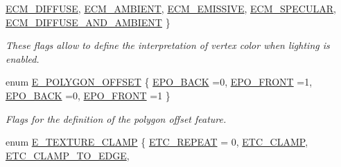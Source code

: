 \begin{DoxyCompactItemize}
\hyperlink{namespaceirr_1_1video_a41af617fc9a691366e4b162cd1cdea78a6c78d3ae122aa9bd1743000ed8987a49}{E\+C\+M\+\_\+\+D\+I\+F\+F\+U\+SE}, 
\newline
\hyperlink{namespaceirr_1_1video_a41af617fc9a691366e4b162cd1cdea78aa33e23437b5ba836e2517bd59868bc7f}{E\+C\+M\+\_\+\+A\+M\+B\+I\+E\+NT}, 
\hyperlink{namespaceirr_1_1video_a41af617fc9a691366e4b162cd1cdea78ac59b7c51c45959923de37c5cb3614515}{E\+C\+M\+\_\+\+E\+M\+I\+S\+S\+I\+VE}, 
\hyperlink{namespaceirr_1_1video_a41af617fc9a691366e4b162cd1cdea78ac152b787506407d3f60d06e91e537afa}{E\+C\+M\+\_\+\+S\+P\+E\+C\+U\+L\+AR}, 
\hyperlink{namespaceirr_1_1video_a41af617fc9a691366e4b162cd1cdea78a45b2587e9b90744517c6f21a36cf9476}{E\+C\+M\+\_\+\+D\+I\+F\+F\+U\+S\+E\+\_\+\+A\+N\+D\+\_\+\+A\+M\+B\+I\+E\+NT}
 \}\begin{DoxyCompactList}\small\item\em These flags allow to define the interpretation of vertex color when lighting is enabled. \end{DoxyCompactList}
\item 
enum \hyperlink{namespaceirr_1_1video_a812b866b910c946f5bc813f8eab31144}{E\+\_\+\+P\+O\+L\+Y\+G\+O\+N\+\_\+\+O\+F\+F\+S\+ET} \{ \hyperlink{namespaceirr_1_1video_a812b866b910c946f5bc813f8eab31144ac452121bed1ec6bd5d57645d832e0d69}{E\+P\+O\+\_\+\+B\+A\+CK} =0, 
\hyperlink{namespaceirr_1_1video_a812b866b910c946f5bc813f8eab31144aff099fa22f7c0b397a1045e548a81704}{E\+P\+O\+\_\+\+F\+R\+O\+NT} =1, 
\hyperlink{namespaceirr_1_1video_a812b866b910c946f5bc813f8eab31144ac452121bed1ec6bd5d57645d832e0d69}{E\+P\+O\+\_\+\+B\+A\+CK} =0, 
\hyperlink{namespaceirr_1_1video_a812b866b910c946f5bc813f8eab31144aff099fa22f7c0b397a1045e548a81704}{E\+P\+O\+\_\+\+F\+R\+O\+NT} =1
 \}\begin{DoxyCompactList}\small\item\em Flags for the definition of the polygon offset feature. \end{DoxyCompactList}
\item 
enum \hyperlink{namespaceirr_1_1video_a5d9933edc5ed7704a7a084f84b39811f}{E\+\_\+\+T\+E\+X\+T\+U\+R\+E\+\_\+\+C\+L\+A\+MP} \{ \newline
\hyperlink{namespaceirr_1_1video_a5d9933edc5ed7704a7a084f84b39811fa40fe3453b44475c3b4ddec00c485b530}{E\+T\+C\+\_\+\+R\+E\+P\+E\+AT} = 0, 
\hyperlink{namespaceirr_1_1video_a5d9933edc5ed7704a7a084f84b39811fa2ed2f44de80e53bb157e1129bdd99530}{E\+T\+C\+\_\+\+C\+L\+A\+MP}, 
\hyperlink{namespaceirr_1_1video_a5d9933edc5ed7704a7a084f84b39811fa235201620b2cabc3f1dbdc963e3095e0}{E\+T\+C\+\_\+\+C\+L\+A\+M\+P\+\_\+\+T\+O\+\_\+\+E\+D\+GE}, 

\end{DoxyCompactItemize}
